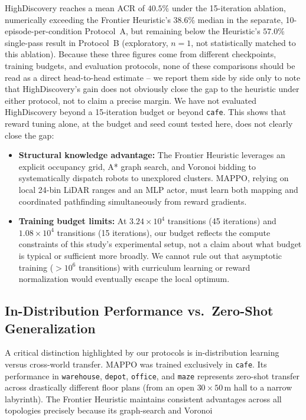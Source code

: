 \documentclass[11pt]{article}
\begin{document}
HighDiscovery reaches a mean ACR of $40.5\%$ under the 15-iteration
ablation, numerically exceeding the Frontier Heuristic's $38.6\%$ median
in the separate, 10-episode-per-condition Protocol~A, but remaining below
the Heuristic's $57.0\%$ single-pass result in Protocol~B (exploratory,
$n{=}1$, not statistically matched to this ablation). Because these three
figures come from different checkpoints, training budgets, and evaluation
protocols, none of these comparisons should be read as a direct head-to-head
estimate -- we report them side by side only to note that HighDiscovery's
gain does not obviously close the gap to the heuristic under either
protocol, not to claim a precise margin. We have not evaluated
HighDiscovery beyond a 15-iteration budget or beyond \texttt{cafe}. This
shows that reward tuning alone, at the budget and seed count tested here,
does not clearly close the gap:
\begin{itemize}
    \item \textbf{Structural knowledge advantage:} The Frontier Heuristic
    leverages an explicit occupancy grid, A* graph search, and Voronoi
    bidding to systematically dispatch robots to unexplored clusters. MAPPO,
    relying on local 24-bin LiDAR ranges and an MLP actor, must learn both
    mapping and coordinated pathfinding simultaneously from reward gradients.
    \item \textbf{Training budget limits:} At $3.24\times 10^4$ transitions
    (45 iterations) and $1.08\times 10^4$ transitions (15 iterations), our
    budget reflects the compute constraints of this study's experimental
    setup, not a claim about what budget is typical or sufficient more
    broadly. We cannot rule out that asymptotic training ($>10^6$ transitions) with
    curriculum learning or reward normalization would eventually escape the
    local optimum.
\end{itemize}

\subsection{In-Distribution Performance vs.\ Zero-Shot Generalization}
A critical distinction highlighted by our protocols is in-distribution
learning versus cross-world transfer. MAPPO was trained exclusively in
\texttt{cafe}. Its performance in \texttt{warehouse}, \texttt{depot},
\texttt{office}, and \texttt{maze} represents zero-shot transfer across
drastically different floor plans (from an open $30\times 50$\,m hall to
a narrow labyrinth). The Frontier Heuristic maintains consistent advantages
across all topologies precisely because its graph-search and Voronoi
\end{document}
